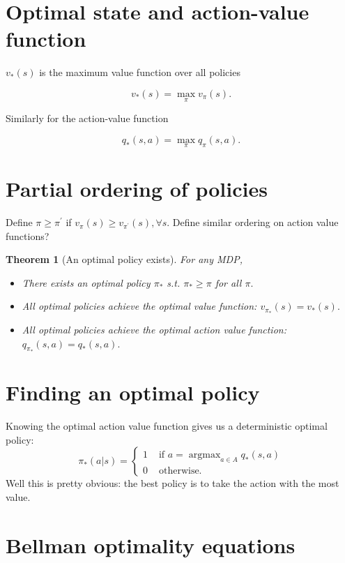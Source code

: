 \documentclass[20pt]{extarticle}
\theoremstyle{plain}
\newtheorem{theorem}{Theorem}
\theoremstyle{definition}
\theoremstyle{remark}
\newcommand{\0}{\varnothing}
\newcommand{\<}{\langle}
\renewcommand{\>}{\rangle}
\begin{document}
\section{Optimal state and action-value function}

\( v _ { * } ( s ) \) is the maximum value function over all policies

\[
v _ { * } ( s ) = \max _ { \pi } v _ { \pi } ( s ).
\]

Similarly for the action-value function

\[
q _ { * } ( s , a ) = \max _ { \pi } q _ { \pi } ( s , a ).
\]

\section{Partial ordering of policies}

Define \( \pi \geq \pi ^ { \prime } \) if \( v _ { \pi } ( s ) \geq v _ { \pi ^ { \prime } } ( s ) , \forall s. \) Define similar ordering on action value functions?

\begin{theorem}[An optimal policy exists]
  For any MDP,
  \begin{itemize}
  \item There exists an optimal policy \( \pi_* \) s.t. \( \pi_* \geq \pi \)
  for all \( \pi. \)
  \item All optimal policies achieve the optimal value function: \( v_{\pi_*}
  (s) = v_*(s). \)
  \item All optimal policies achieve the optimal action value function: \(
  q_{\pi_*} (s, a) = q_*(s, a). \)
  \end{itemize}
\end{theorem}

\section{Finding an optimal policy}

Knowing the optimal action value function gives us a deterministic optimal policy:
\[
\pi _ { * } ( a | s ) = \left\{
  \begin{array} { ll }
  { 1 } & { \text { if } a = \operatorname { argmax }_{a\in A} q_*(s, a) } \\
  { 0 } & { \text { otherwise. } }
  \end{array}
\right.
\]
Well this is pretty obvious: the best policy is to take the action with the most
value.

\section{Bellman optimality equations}
\end{document}
